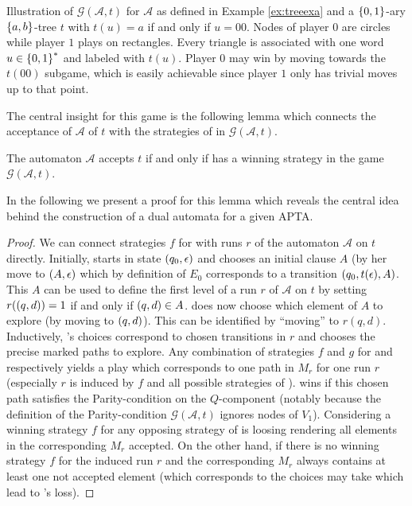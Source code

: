 \begin{drawing}
  \caption{
    Illustration of $\mathcal{G}(\mathcal{A}, t)$ for $\mathcal{A}$ as
    defined in Example \ref{ex:treeexa} and a $\left\{0,1\right\}$-ary $\left\{a,b\right\}$-tree
    $t$ with $t(u) = a$ if and only if $u = 00$. Nodes of player $0$ are 
    circles while player $1$ plays on rectangles. Every triangle is 
    associated with one word $u\in\left\{0,1\right\}^{*}$ and labeled with $t(u)$. 
    Player $0$ may win by moving towards the $t(00)$ subgame, which is easily
    achievable since player $1$ only has trivial moves up to that point.
  }
  \label{fig:treeacceptancegame}
  \begin{center}
  \end{center}
\end{drawing}

The central insight for this game is the following lemma which connects the 
acceptance of $\mathcal{A}$ of $t$ with the strategies of \eve{} in 
$\mathcal{G}(\mathcal{A}, t)$.
\begin{lemma}
  \cite[Lemma 3.1.]{AltTreeAuto}
  The automaton $\mathcal{A}$ accepts $t$ if and only if \eve{} has a 
  winning strategy in the game $\mathcal{G}(\mathcal{A}, t)$.
  \label{lem:stratacceptance}
\end{lemma}
In the following we present a proof for this lemma which reveals the 
central idea behind the construction of a dual automata for a given \ac{APTA}.
\begin{proof}
  We can connect strategies $f$ for \eve{} with runs $r$ of the automaton 
  $\mathcal{A}$ on $t$ directly. Initially, \eve{} starts in state 
  $\left(q_{0}, \epsilon\right)$ and chooses an initial clause $A$ (by her move
  to $\left(A, \epsilon\right)$ which by definition of $E_{0}$ corresponds to a 
  transition $\left(q_{0}, t(\epsilon), A\right)$. This $A$ can be used to define 
  the first level of a run $r$ of $\mathcal{A}$ on $t$ by setting 
  $r(\left(q,d\right)) = 1$ if and only if $\left(q,d\right)\in A$. \adam{} does now 
  choose which element of $A$ to explore (by moving to $\left(q, d\right)$). This 
  can be identified by \enquote{moving} to $r(q, d)$. Inductively, \eve{}'s 
  choices correspond to chosen transitions in $r$ and \adam{} chooses the 
  precise marked paths to explore. Any combination of strategies $f$ and $g$
  for \eve{} and \adam{} respectively yields a play which corresponds to one 
  path in $M_{r}$ for one run $r$ (especially $r$ is induced by $f$ and all
  possible strategies of \adam{}). \eve{} wins if this chosen path satisfies
  the Parity-condition on the $Q$-component (notably because the definition of
  the Parity-condition $\mathcal{G}(\mathcal{A}, t)$ ignores nodes of $V_{1}$).
  Considering a winning strategy $f$ for \eve{} any opposing strategy of 
  \adam{} is loosing rendering all elements in the corresponding $M_{r}$ 
  accepted. On the other hand, if there is no winning strategy $f$ for \eve{}
  the induced run $r$ and the corresponding $M_{r}$ always contains at least 
  one not accepted element (which corresponds to the choices \adam{} may take 
  which lead to \eve{}'s loss).
\end{proof}

